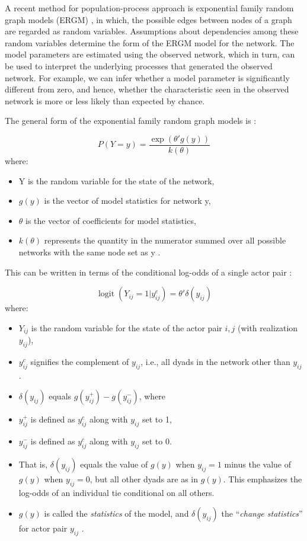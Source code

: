 \documentclass{acm_proc_article-sp}
\begin{document}
A recent method for population-process approach is exponential family random graph models (ERGM) \cite{Robins}, in which, the possible edges between nodes of a graph are regarded as random variables. Assumptions about dependencies among these random variables determine the form of the ERGM model for the network. The model parameters are estimated using the observed network, which in turn, can be used to interpret the underlying processes that generated the observed network. For example, we can infer whether a model parameter is significantly different from zero, and hence, whether the characteristic seen in the observed network is more or less likely than expected by chance.

The general form of the exponential family random graph models is \cite{Krivitsky}: 

\begin{equation} P(Y=y)=\frac{\exp(\theta'g(y))}{k(\theta)} \end{equation}
where:
\begin{itemize}
\item Y is the random variable for the state of the network,
\item \( g(y) \) is the vector of model statistics for network y,
\item \( \theta \) is the vector of coefficients for model statistics, 
\item \( k(\theta) \) represents the quantity in the numerator summed over all possible networks with the same node set as y \cite{Krivitsky}.
\end{itemize}
This can be written in terms of the conditional log-odds of a single actor pair \cite{Krivitsky}:

\begin{equation} \operatorname{logit}{(Y_{ij}=1|y^{c}_{ij})=\theta'\delta(y_{ij})} \end{equation}
where: 
\begin{itemize}
\item \( Y_{ij} \) is the random variable for the state of the actor pair \( i,j \) (with realization \( y_{ij} \)), 
\item \( y^{c}_{ij} \) signifies the complement of \( y_{ij} \), i.e., all dyads in the network other than \( y_{ij} \). 
\item \( \delta(y_{ij}) \) equals \( g(y^{+}_{ij})-g(y^{-}_{ij}) \), where 
\item \( y^{+}_{ij} \) is defined as \( y^{c}_{ij} \) along with \( y_{ij} \) set to 1,
\item \( y^{-}_{ij} \) is defined as \( y^{c}_{ij} \) along with \( y_{ij} \) set to 0.
\item That is, \( \delta(y_{ij}) \) equals the value of \( g(y) \) when \( y_{ij}=1 \) minus the value of \( g(y) \) when \( y_{ij}=0 \), but all other dyads are as in \( g(y) \). This emphasizes the log-odds of an individual tie conditional on all others. 
\item \( g(y) \) is called the \textit{statistics} of the model, and \(\delta(y_{ij}) \) the ``\textit{change statistics}'' for actor pair \( y_{ij} \) \cite{Krivitsky}.
\end{itemize}
\end{document}
